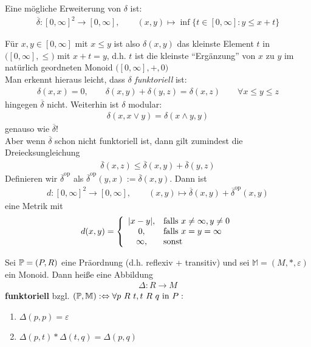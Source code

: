 \begin{lemma}
Eine mögliche Erweiterung von $\delta$ ist:
\begin{align*}
\overline{\delta}:[0,\infty]^2\to[0,\infty],\qquad
(x,y)\mapsto\inf\big\lbrace t\in[0,\infty]:y\leq x+t\big\rbrace
\end{align*}
\end{lemma}

\begin{bemerkung}
Für $x,y\in[0,\infty]$ mit $x\leq y$ ist also $\delta(x,y)$ das kleinste Element $t$ in $\big([0,\infty],\leq\big)$ mit $x+t=y$, d.h. $t$ ist die kleinste ``Ergänzung'' von $x$ zu $y$ im natürlich geordneten Monoid $\big([0,\infty],+,0\big)$\\
Man erkennt hieraus leicht, dass $\delta$ \textit{funktoriell} ist:
\begin{align*}
\delta(x,x)=0,\qquad\delta(x,y)+\delta(y,z)=\delta (x,z)\qquad\forall x\leq y\leq z
\end{align*}
hingegen $\overline{\delta}$ nicht. Weiterhin ist $\delta$ modular:
\begin{align*}
\delta(x,x\vee y)=\delta(x\wedge y,y)
\end{align*}
genauso wie $\overline{\delta}$!\\
Aber wenn $\overline{\delta}$ schon nicht funktoriell ist, dann gilt zumindest die Dreiecksungleichung
\begin{align*}
\overline{\delta}(x,z)\leq\overline{\delta}(x,y)+\overline{\delta}(y,z)
\end{align*}
Definieren wir $\overline{\delta}^{\text{op}}$ als $\overline{\delta}^{\text{op}}(y,x):=\overline{\delta}(x,y)$. Dann ist
\begin{align*}
d:[0,\infty]^2\to[0,\infty],\qquad (x,y)\mapsto\overline{\delta}(x,y)+\overline{\delta}^{\text{op}}(x,y)
\end{align*}
eine Metrik mit
\begin{align*}
d(x,y)=\left\lbrace\begin{array}{cl}
|x-y|, &\falls x\neq\infty,y\neq0\\
0, &\falls x=y=\infty\\
\infty, &\sonst
\end{array}\right.
\end{align*}
\end{bemerkung}

\begin{definition}
Sei $\P=(P,R)$ eine Präordnung (d.h. reflexiv + transitiv) und sei $\mathbb{M}=(M,\ast,\varepsilon)$ ein Monoid. Dann heiße eine Abbildung
\begin{align*}
\Delta:R\to M
\end{align*}
\textbf{funktoriell} bzgl. $(\P,\mathbb{M}):\gdw\forall p~R~t,t~R~q\text{ in }P:$
\begin{enumerate}
\item $\Delta(p,p)=\varepsilon$
\item $\Delta(p,t)\ast\Delta(t,q)=\Delta(p,q)$
\end{enumerate}
\end{definition}
 
